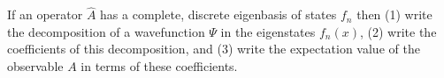 

\vspace*{\fill}
\centering

If an operator $\hat{A}$ has a complete, discrete eigenbasis of states $f_{n}$ then (1) write the decomposition of a wavefunction $\Psi$ in the eigenstates $f_{n}(x)$, (2) write the coefficients of this decomposition, and (3) write the expectation value of the observable $A$ in terms of these coefficients.

\centering
\vspace*{\fill}

